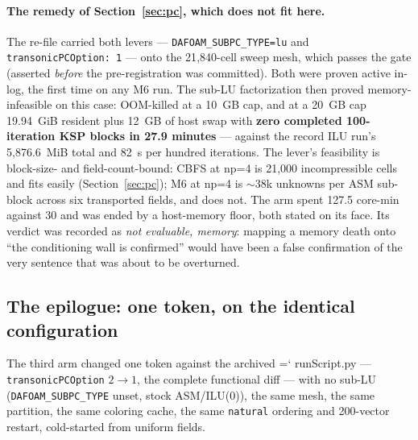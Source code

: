 \documentclass[11pt,a4paper]{article}
\newcommand{\artifact}[1]{{\small\ttfamily\hyphenchar\font=`\-\relax
  \def\_{\textunderscore\allowbreak}#1}}
\begin{document}
\paragraph{The remedy of Section~\ref{sec:pc}, which does not fit here.} The re-file carried
both levers --- \texttt{DAFOAM\_SUBPC\_TYPE=lu} and \texttt{transonicPCOption: 1} --- onto the
21{,}840-cell sweep mesh, which passes the gate (asserted \emph{before} the pre-registration
was committed). Both were proven active in-log, the first time on any M6 run. The sub-LU
factorization then proved memory-infeasible on this case: OOM-killed at a 10~GB cap, and at a
20~GB cap 19.94~GiB resident plus 12~GB of host swap with \textbf{zero completed
100-iteration KSP blocks in 27.9 minutes} --- against the record ILU run's 5{,}876.6~MiB total
and 82~s per hundred iterations. The lever's feasibility is block-size- and field-count-bound:
CBFS at np=4 is 21{,}000 incompressible cells and fits easily (Section~\ref{sec:pc}); M6 at
np=4 is \(\sim\)38k unknowns per ASM sub-block across six transported fields, and does not.
The arm spent 127.5 core-min against 30 and was ended by a host-memory floor, both stated on
its face. Its verdict was recorded as \emph{not evaluable, memory}: mapping a memory death
onto ``the conditioning wall is confirmed'' would have been a false confirmation of the very
sentence that was about to be overturned.

\subsection{The epilogue: one token, on the identical configuration}

The third arm changed one token against the archived \artifact{runScript.py} ---
\texttt{transonicPCOption} \(2\rightarrow1\), the complete functional diff --- with no sub-LU
(\texttt{DAFOAM\_SUBPC\_TYPE} unset, stock ASM/ILU(0)), the same mesh, the same partition, the
same coloring cache, the same \texttt{natural} ordering and 200-vector restart, cold-started
from uniform fields.
\end{document}
